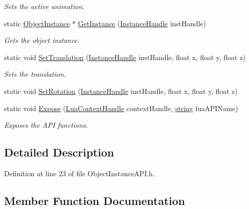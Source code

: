 \begin{DoxyCompactItemize}
\begin{DoxyCompactList}\small\item\em Sets the active animation. \end{DoxyCompactList}\item 
static \hyperlink{class_object_instance}{Object\+Instance} $\ast$ \hyperlink{class_object_instance_a_p_i_ad5097ac5c9231e23c5f7f08a6bf6de84}{Get\+Instance} (\hyperlink{_lua_object_instance_manager_8h_a317edebd09c13058779c942342947a0d}{Instance\+Handle} inst\+Handle)
\begin{DoxyCompactList}\small\item\em Gets the object instance. \end{DoxyCompactList}\item 
static void \hyperlink{class_object_instance_a_p_i_a1b8b5a5e6d2cbff35346cdcfe22d7853}{Set\+Translation} (\hyperlink{_lua_object_instance_manager_8h_a317edebd09c13058779c942342947a0d}{Instance\+Handle} inst\+Handle, float x, float y, float z)
\begin{DoxyCompactList}\small\item\em Sets the translation. \end{DoxyCompactList}\item 
static void \hyperlink{class_object_instance_a_p_i_abb6be8e818a4f8ce8d243d615834b8bb}{Set\+Rotation} (\hyperlink{_lua_object_instance_manager_8h_a317edebd09c13058779c942342947a0d}{Instance\+Handle} inst\+Handle, float x, float y, float z)
\item 
static void \hyperlink{class_object_instance_a_p_i_a67d3d45f8e6d2933bb09338622504cc2}{Expose} (\hyperlink{_lua_context_8h_a2ffcc2d3ed21165072a1d7b61259bf14}{Lua\+Context\+Handle} context\+Handle, \hyperlink{_types_8h_ad453f9f71ce1f9153fb748d6bb25e454}{string} lua\+A\+P\+I\+Name)
\begin{DoxyCompactList}\small\item\em Exposes the A\+PI functions. \end{DoxyCompactList}\end{DoxyCompactItemize}


\subsection{Detailed Description}


Definition at line 23 of file Object\+Instance\+A\+P\+I.\+h.



\subsection{Member Function Documentation}
